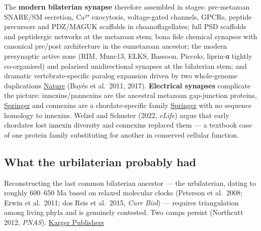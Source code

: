 The \textbf{modern bilaterian synapse} therefore assembled in stages: pre-metazoan SNARE/SM secretion, Ca²⁺ exocytosis, voltage-gated channels, GPCRs, peptide precursors and PDZ/MAGUK scaffolds in choanoflagellates; full PSD scaffolds and peptidergic networks at the metazoan stem; bona fide chemical synapses with canonical pre/post architecture in the eumetazoan ancestor; the modern presynaptic active zone (RIM, Munc13, ELKS, Bassoon, Piccolo, liprin-α tightly co-organised) and polarised unidirectional synapses at the bilaterian stem; and dramatic vertebrate-specific paralog expansion driven by two whole-genome duplications \href{https://www.nature.com/articles/ncomms14613}{Nature} (Bayés et al.~2011, 2017). \textbf{Electrical synapses} complicate the picture: innexins/pannexins are the ancestral metazoan gap-junction proteins, \href{https://link.springer.com/article/10.1186/s12862-019-1369-4}{Springer} and connexins are a chordate-specific family \href{https://link.springer.com/article/10.1186/s12862-019-1369-4}{Springer} with no sequence homology to innexins. Welzel and Schuster (2022, \emph{eLife}) argue that early chordates lost innexin diversity and connexins replaced them --- a textbook case of one protein family substituting for another in conserved cellular function.

\subsection{What the urbilaterian probably had}\label{04_urbilateria-what-the-urbilaterian-probably-had}

Reconstructing the last common bilaterian ancestor --- the urbilaterian, dating to roughly 600--650 Ma based on relaxed molecular clocks (Peterson et al.~2008; Erwin et al.~2011; dos Reis et al.~2015, \emph{Curr Biol}) --- requires triangulation among living phyla and is genuinely contested. Two camps persist (Northcutt 2012, \emph{PNAS}). \href{https://karger.com/bbe/article/82/4/211/326147/How-Basal-Are-the-Basal-Ganglia-Commentary-on}{Karger Publishers}

